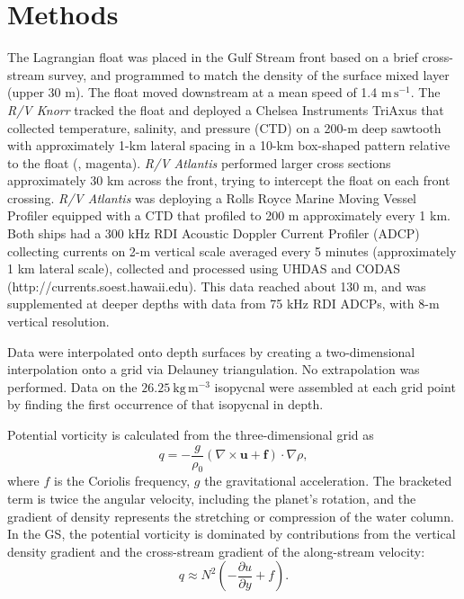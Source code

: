 \documentclass{article}
\begin{document}
\section*{Methods}

The Lagrangian float\cite{dasaro03} was placed in the Gulf Stream front based on a brief cross-stream survey, and programmed to match the density of the surface mixed layer (upper 30 m).  The float moved downstream at a mean speed of 1.4 $\mathrm{m\,s^{-1}}$.  The \emph{R/V Knorr} tracked the float and deployed a Chelsea Instruments TriAxus that  collected temperature, salinity, and pressure (CTD) on a 200-m deep sawtooth with approximately 1-km lateral spacing in a 10-km box-shaped pattern relative to the float (, magenta).  \emph{R/V Atlantis} performed larger cross sections approximately 30 km across the front, trying to intercept the float on each front crossing.  \emph{R/V Atlantis} was deploying a Rolls Royce Marine Moving Vessel Profiler equipped with a CTD that profiled to 200 m approximately every 1 km.  Both ships had a 300 kHz RDI Acoustic Doppler Current Profiler (ADCP) collecting currents on 2-m vertical scale averaged every 5 minutes (approximately 1 km lateral scale), collected and processed using UHDAS and CODAS (http://currents.soest.hawaii.edu\cite{firingetal12}).  This data reached about 130 m, and was supplemented at deeper depths with data from 75 kHz RDI ADCPs, with 8-m vertical resolution.  

Data were interpolated onto depth surfaces by creating a two-dimensional interpolation onto a grid via Delauney triangulation. No extrapolation was performed.  Data on the $26.25\ \mathrm{kg\,m^{-3}}$ isopycnal were assembled at each grid point by finding the first occurrence of that isopycnal in depth.  

Potential vorticity is calculated from the three-dimensional grid as
\begin{equation}
  q = -\frac{g}{\rho_0}\left(\nabla \times\mathbf{u}+\mathbf{f}\right) \cdot \nabla\rho,
\end{equation}
where $f$ is the Coriolis frequency, $g$ the gravitational acceleration. The bracketed term is twice the angular velocity, including the planet's rotation, and the gradient of density represents the stretching or compression of the water column.  In the GS, the potential vorticity is dominated by contributions from the vertical density gradient and the cross-stream gradient of the along-stream velocity:
\begin{equation}
  q \approx N^2\left(-\frac{\partial u}{\partial y}+f\right).
\end{equation}
\end{document}

